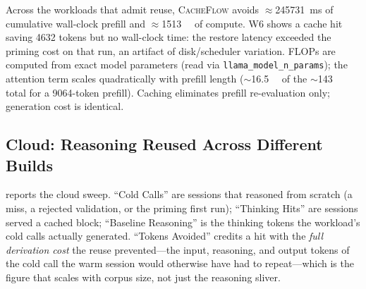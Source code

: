 \documentclass[10pt]{article}
\begin{document}
Across the workloads that admit reuse, \textsc{CacheFlow} avoids
$\approx$\SI{245731}{\milli\second} of cumulative wall-clock prefill and
$\approx$\SI{1513}{\tera\flop} of compute. W6 shows a cache hit saving \num{4632}
tokens but no wall-clock time: the restore latency exceeded the priming cost on
that run, an artifact of disk/scheduler variation. FLOPs are computed from exact
model parameters (read via \texttt{llama\_model\_n\_params}); the attention term
scales quadratically with prefill length ($\sim$\SI{16.5}{\tera\flop} of the
$\sim$\SI{143}{\tera\flop} total for a \num{9064}-token prefill). Caching
eliminates prefill re-evaluation only; generation cost is identical.

\subsection{Cloud: Reasoning Reused Across Different Builds}
 reports the cloud sweep. ``Cold Calls'' are sessions that
reasoned from scratch (a miss, a rejected validation, or the priming first
run); ``Thinking Hits'' are sessions served a cached block; ``Baseline
Reasoning'' is the thinking tokens the workload's cold calls actually
generated. ``Tokens Avoided'' credits a hit with the \emph{full derivation
cost} the reuse prevented---the input, reasoning, and output tokens of the
cold call the warm session would otherwise have had to repeat---which is the
figure that scales with corpus size, not just the reasoning sliver.
\end{document}
